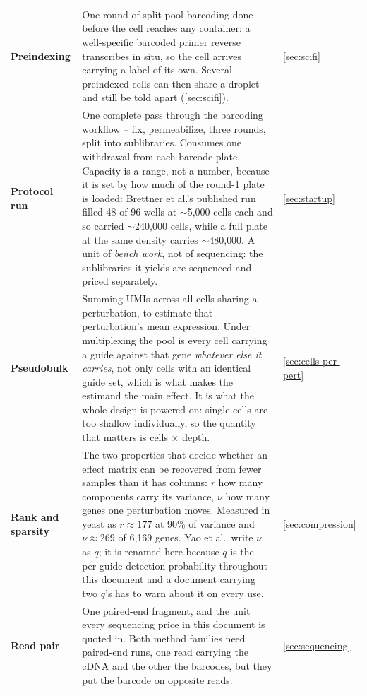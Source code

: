 \begin{longtable}{@{}>{\raggedright\arraybackslash}p{}>{\raggedright\arraybackslash}p{}>{\raggedright\arraybackslash}p{}@{}}
\textbf{Preindexing} & One round of split-pool barcoding done before the cell reaches any container: a well-specific barcoded primer reverse transcribes in situ, so the cell arrives carrying a label of its own. Several preindexed cells can then share a droplet and still be told apart (\cref{sec:scifi}). & \cref{sec:scifi} \\
\addlinespace[5pt]
\textbf{Protocol run} & One complete pass through the barcoding workflow -- fix, permeabilize, three rounds, split into sublibraries. Consumes one withdrawal from each barcode plate. Capacity is a range, not a number, because it is set by how much of the round-1 plate is loaded: Brettner et al.'s published run filled 48 of 96 wells at $\sim$5{,}000 cells each and so carried $\sim$240{,}000 cells, while a full plate at the same density carries $\sim$480{,}000. A unit of \emph{bench work}, not of sequencing: the sublibraries it yields are sequenced and priced separately.~\citep{brettnerUltraHighthroughputMassively2024} & \cref{sec:startup} \\
\addlinespace[5pt]
\textbf{Pseudobulk} & Summing UMIs across all cells sharing a perturbation, to estimate that perturbation's mean expression. Under multiplexing the pool is every cell carrying a guide against that gene \emph{whatever else it carries}, not only cells with an identical guide set, which is what makes the estimand the main effect. It is what the whole design is powered on: single cells are too shallow individually, so the quantity that matters is cells $\times$ depth. & \cref{sec:cells-per-pert} \\
\addlinespace[5pt]
\textbf{Rank and sparsity}\newline {\color{tcgray}($r$, $\nu$)} & The two properties that decide whether an effect matrix can be recovered from fewer samples than it has columns: $r$ how many components carry its variance, $\nu$ how many genes one perturbation moves. Measured in yeast as $r\approx177$ at 90\% of variance and $\nu\approx269$ of 6{,}169 genes. Yao et al.\ write $\nu$ as $q$; it is renamed here because $q$ is the per-guide detection probability throughout this document and a document carrying two $q$'s has to warn about it on every use. & \cref{sec:compression} \\
\addlinespace[5pt]
\textbf{Read pair} & One paired-end fragment, and the unit every sequencing price in this document is quoted in. Both method families need paired-end runs, one read carrying the cDNA and the other the barcodes, but they put the barcode on opposite reads. & \cref{sec:sequencing} \\

\end{longtable}
